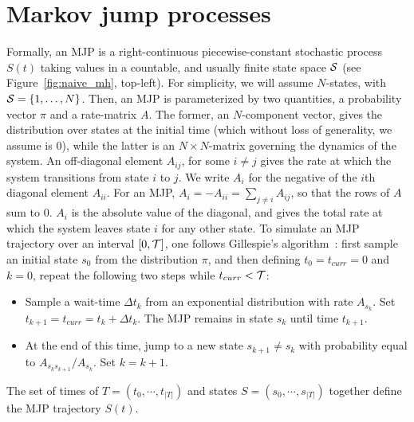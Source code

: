 \section{Markov jump processes}
Formally, an MJP is a right-continuous piecewise-constant stochastic
process $S(t)$ taking values in a countable, and usually finite state
space ${\mathcal S}$ (see Figure~\ref{fig:naive_mh}, top-left).
For simplicity, we will assume $N$-states, with ${\mathcal S} = \{1,\ldots,N\}$. Then, 
an MJP is parameterized by two quantities, a probability vector $\pi$ and a 
rate-matrix $A$. The former, an $N$-component vector, gives the 
distribution over states at the initial time (which without loss of 
generality, we assume is $0$), while the latter is an 
$N \times N$-matrix governing the dynamics of the system.  An 
off-diagonal element $A_{ij}$, for some $i \neq j$ gives the rate at 
which the system transitions from state $i$ to $j$. We write $A_i$ for the 
negative of the $i$th diagonal element $A_{ii}$. For an MJP,
$A_i = -A_{ii} = \sum_{j \neq i} A_{ij}$, so that the rows of $A$ sum to $0$.  
$A_i$ is the absolute value of the diagonal,
and gives the total rate at which the system leaves state $i$ for any other state.
To simulate an MJP trajectory over an interval $[0,{\mathcal T}]$, one follows 
Gillespie's algorithm~\cite{gillespie97}: 
first sample an initial state $s_0$ from the distribution $\pi$, and
then defining $t_0 = t_{curr} = 0$ and $k = 0$, repeat the following two steps while
$t_{curr} < {\mathcal T}$:
\begin{itemize}
  \item Sample a wait-time $\Delta t_k$ from an exponential distribution with rate 
    $A_{s_k}$.  Set $t_{k+1} = t_{curr} = t_{k} + \Delta t_k$.
    The MJP remains in state $s_k$ until time $t_{k+1}$.
  \item At the end of this time, jump to a new state $s_{k+1} \neq s_k$ with 
    probability equal to $A_{s_ks_{k+1}}/A_{s_k}$. Set $k=k+1$.
\end{itemize}
The set of times of $T=(t_0, \cdots, t_{|T| })$ and states 
$S=(s_0, \cdots, s_{|T| })$ together define the MJP trajectory $S(t)$.

